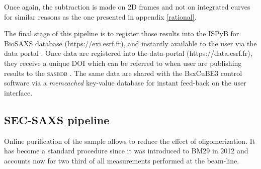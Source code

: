 \documentclass[preprint]{iucr}              %
\begin{document}
Once again, the subtraction is made on 2D frames and not on integrated curves for similar reasons as the one presented in appendix \ref{rational}.



The final stage of this pipeline is to register those results into the ISPyB for BioSAXS database \cite{ISPYBB} (https://exi.esrf.fr), and instantly available to the user via the data portal \cite{data-portal}. 
Once data are registered into the data-portal (https://data.esrf.fr), they receive a unique DOI which can be referred to when user are publishing results to the \textsc{sasbdb} \cite{sasbdb}.
The same data are shared with the BsxCuBE3 control software via a \textit{memcached} key-value database for instant feed-back on the user interface.

\subsection{SEC-SAXS pipeline}
Online purification of the sample allows to reduce the effect of oligomerization.
It has become a standard procedure since it was introduced to BM29 in 2012 \cite{SECPaper2012} and accounts now for two third of all measurements performed at the beam-line.
\end{document}
